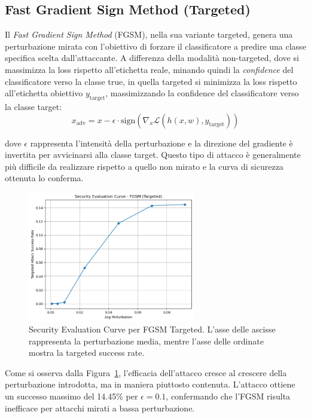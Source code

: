         \subsection{Fast Gradient Sign Method (Targeted)}
            Il \textit{Fast Gradient Sign Method} (FGSM), nella sua variante targeted, genera una perturbazione mirata con l’obiettivo di forzare il classificatore a predire una classe specifica scelta dall’attaccante. A differenza della modalità non-targeted, dove si massimizza la loss rispetto all’etichetta reale, minando quindi la \textit{confidence} del classificatore verso la classe true, in quella targeted si minimizza la loss rispetto all’etichetta obiettivo $y_{\text{target}}$, massimizzando la confidence del classificatore verso la classe target:
            \[
            x_{\text{adv}} = x - \epsilon \cdot \text{sign}\left( \nabla_x \mathcal{L}(h(x, w), y_{\text{target}}) \right)
            \]
            
            \noindent dove $\epsilon$ rappresenta l’intensità della perturbazione e la direzione del gradiente è invertita per avvicinarsi alla classe target.
            Questo tipo di attacco è generalmente più difficile da realizzare rispetto a quello non mirato e la curva di sicurezza ottenuta lo conferma.
            
            \begin{figure}[H]
                \centering
                \includegraphics[width=0.65\textwidth]{images/evaluation_curve_fgsm_targeted.png}
                \caption{Security Evaluation Curve per FGSM Targeted. L'asse delle ascisse rappresenta la perturbazione media, mentre l'asse delle ordinate mostra la targeted success rate.}
                \label{fig:fgsm_targeted_curve}
            \end{figure}
            
            \noindent Come si osserva dalla Figura~\ref{fig:fgsm_targeted_curve}, l'efficacia dell'attacco cresce al crescere della perturbazione introdotta, ma in maniera piuttosto contenuta. L'attacco ottiene un successo massimo del 14.45\% per \(\epsilon = 0.1\), confermando che l’FGSM risulta inefficace per attacchi mirati a bassa perturbazione.
            
